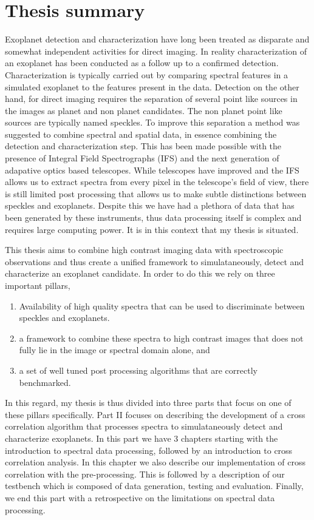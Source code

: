 \chapter*{Thesis summary}
Exoplanet detection and characterization have long been treated as disparate and somewhat independent activities for direct imaging. 
In reality characterization of an exoplanet has been conducted as a follow up to a confirmed detection.
Characterization is typically carried out by comparing spectral features in a simulated exoplanet to the features present \@
in the data.
Detection on the other hand, for direct imaging requires the separation of several point like sources in the images as planet\@
and non planet candidates.
The non planet point like sources are typically named speckles. 
To improve this separation a method was suggested to combine spectral and spatial data, in essence combining the detection 
and characterization step.
This has been made possible with the presence of Integral Field Spectrographs (IFS) and the next generation of adapative optics based 
telescopes.
While telescopes have improved and the IFS allows us to extract spectra from every pixel in the telescope's field of view, there is still 
limited post processing that allows us to make subtle distinctions between speckles and exoplanets.
Despite this we have had a plethora of data that has been generated by these instruments, thus data processing itself is complex and requires 
large computing power.
It is in this context that my thesis is situated.

This thesis aims to combine high contrast imaging data with spectroscopic observations and thus create a unified framework to simulataneously,
detect and characterize an exoplanet candidate.
In order to do this we rely on three important pillars,
\begin{enumerate}
    \item Availability of high quality spectra that can be used to discriminate between speckles and exoplanets.
    \item a framework to combine these spectra to high contrast images that does not fully lie in the image or spectral domain alone, and
    \item a set of well tuned post processing algorithms that are correctly benchmarked.
\end{enumerate}
In this regard, my thesis is thus divided into three parts that focus on one of these pillars specifically.
Part II focuses on describing the development of a cross correlation algorithm that processes spectra to simulataneously\@
detect and characterize exoplanets.
In this part we have $3$ chapters starting with the introduction to spectral data processing, followed by an introduction
to cross correlation analysis. 
In this chapter we also describe our implementation of cross correlation with the pre-processing.
This is followed by a description of our testbench which is composed of data generation, testing and evaluation.
Finally, we end this part with a retrospective on the limitations on spectral data processing. 

